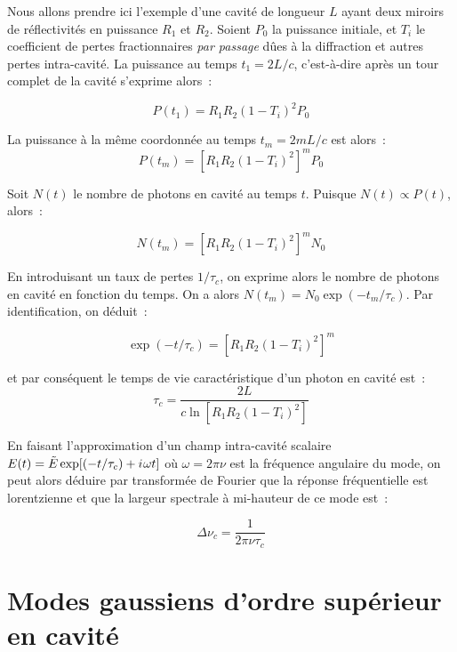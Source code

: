 \documentclass[a4paper]{book}
\newcommand{\iu}{{i\mkern1mu}}
\begin{document}
Nous allons prendre ici l'exemple d'une cavité de longueur $L$ ayant deux miroirs de réflectivités en puissance $R_1$ et $R_2$. Soient $P_0$ la puissance initiale, et $T_i$ le coefficient de pertes fractionnaires \textit{par passage} dûes à la diffraction et autres pertes intra-cavité. La puissance au temps $t_1=2L/c$, c'est-à-dire après un tour complet de la cavité s'exprime alors~: 

\begin{equation}
    P(t_1)=R_1R_2(1-T_i)^2P_0
\end{equation}

La puissance à la même coordonnée au temps $t_m = 2mL/c$ est alors~:
\begin{equation}
    P(t_m)=\left[R_1R_2(1-T_i)^2\right]^mP_0
\end{equation}

Soit $N(t)$ le nombre de photons en cavité au temps $t$. Puisque $N(t)\propto P(t)$, alors~:

\begin{equation}
    N(t_m)=\left[R_1R_2(1-T_i)^2\right]^mN_0
\end{equation}

En introduisant un taux de pertes $1/\tau_c$, on exprime alors le nombre de photons en cavité en fonction du temps. On a alors $N(t_m) = N_0\exp(-t_m/\tau_c)$. Par identification, on déduit~:

\begin{equation}
    \exp(-t/\tau_c)=\left[R_1R_2(1-T_i)^2\right]^m
\end{equation}

et par conséquent le temps de vie caractéristique d'un photon en cavité est~:
\begin{equation}
    \tau_c = \frac{2L}{c \ln[R_1R_2(1-T_i)^2]}
\end{equation}

En faisant l'approximation d'un champ intra-cavité scalaire $E(t) = \tilde E\exp[(-t/\tau_c)+\iu \omega t]$ où $\omega = 2\pi \nu$ est la fréquence angulaire du mode, on peut alors déduire par transformée de Fourier que la réponse fréquentielle est lorentzienne et que la largeur spectrale à mi-hauteur de ce mode est~:

\begin{equation}
    \Delta \nu_c = \frac{1}{2\pi\nu\tau_c}
\end{equation}


\section{Modes gaussiens d'ordre supérieur en cavité}
\end{document}
